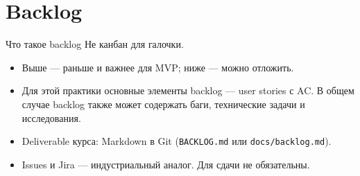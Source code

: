 \section{Backlog}

\begin{frame}{Что такое backlog}
   Не канбан \flqq для галочки\frqq.

  \medskip
  \begin{itemize}\setlength\itemsep{0.4em}
    \item Выше --- раньше и важнее для MVP; ниже --- можно отложить.
    \item Для этой практики основные элементы backlog --- user stories с AC.
          В общем случае backlog также может содержать баги,
          технические задачи и исследования.
    \item Deliverable курса: Markdown в Git (\texttt{BACKLOG.md} или \texttt{docs/backlog.md}).
    \item Issues и Jira --- индустриальный аналог. Для сдачи не обязательны.
  \end{itemize}
\end{frame}
